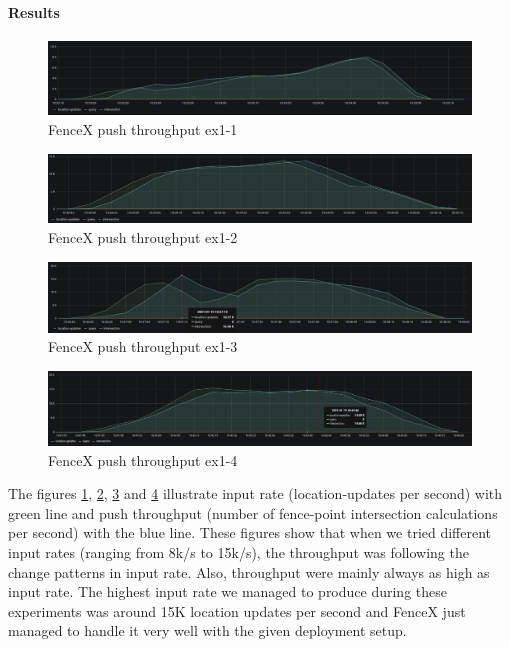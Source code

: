 \documentclass[a4]{report}
\begin{document}
    \paragraph{Results}
    \begin{figure}[ht]
        \caption{FenceX push throughput ex1-1}
        \label{fig:ex1-1}
        \includegraphics[scale=0.4]{images/evaluation/ex1-benchmarking(15,6).png}
    \end{figure}

    \begin{figure}[ht]
        \caption{FenceX push throughput ex1-2}
        \label{fig:ex1-2}
        \includegraphics[scale=0.4]{images/evaluation/ex1-benchmarking(19,7).png}
    \end{figure}

    \begin{figure}[ht]
        \caption{FenceX push throughput ex1-3}
        \label{fig:ex1-3}
        \includegraphics[scale=0.4]{images/evaluation/ex1-benchmarking(22,9).png}
    \end{figure}

    \begin{figure}[ht]
        \caption{FenceX push throughput ex1-4}
        \label{fig:ex1-4}
        \includegraphics[scale=0.4]{images/evaluation/ex1-benchmarking(23,10).png}
    \end{figure}

    The figures \ref{fig:ex1-1}, \ref{fig:ex1-2}, \ref{fig:ex1-3} and \ref{fig:ex1-4} illustrate input rate
    (location-updates per second) with green line and push throughput (number of fence-point intersection
    calculations per second) with the blue line.
    These figures show that when we tried different input rates (ranging from 8k/s to 15k/s), the throughput was
    following the change patterns in input rate.
    Also, throughput were mainly always as high as input rate.
    The highest input rate we managed to produce during these experiments was around 15K location updates per second
    and FenceX just managed to handle it very well with the given deployment setup.
\end{document}
